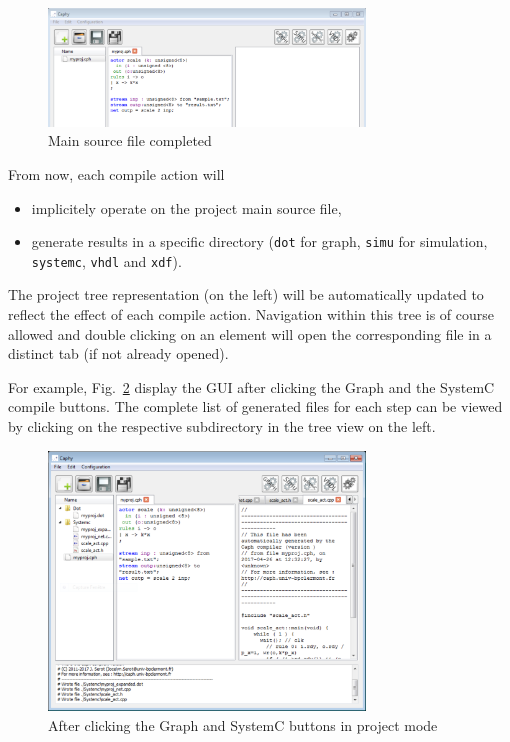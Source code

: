\begin{figure}[h]
  \centering
  \includegraphics[width=0.75\textwidth]{figs/ide/project-main-done}
  \caption{Main source file completed}
  \label{fig:project-main-done}
\end{figure}

\medskip
\step From now, each compile action will 
\begin{itemize}
\item implicitely operate on the project main source file,
\item generate results in a specific directory (\texttt{dot} for graph, \texttt{simu} for
  simulation, \texttt{systemc}, \texttt{vhdl} and \texttt{xdf}).
\end{itemize}

The project tree representation (on the left) will be automatically updated to reflect the effect of
each compile action. Navigation within this tree  is of course allowed and double clicking on an
element will open the corresponding file in a distinct tab (if not already opened).

For example, Fig.~\ref{fig:project-make} display the GUI after clicking the \textsf{Graph}
and the \textsf{SystemC} compile buttons. The complete list of generated files for each step can be viewed by
clicking on the respective subdirectory in the tree view on the left.

\begin{figure}[h]
  \centering
  \includegraphics[width=0.75\textwidth]{figs/ide/project-make}
  \caption{After clicking the \textsf{Graph} and \textsf{SystemC} buttons in project mode}
  \label{fig:project-make}
\end{figure}

